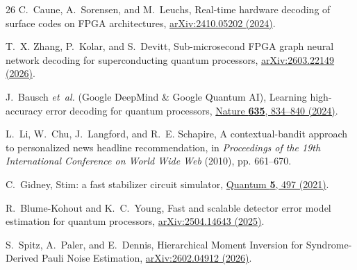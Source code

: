\documentclass[aps,prxquantum,reprint,superscriptaddress,floatfix,nofootinbib]{revtex4-2}
\begin{document}
\begin{thebibliography}{26}
C.~Caune, A.~Sorensen, and M.~Leuchs,
\newblock Real-time hardware decoding of surface codes on FPGA architectures,
\newblock \href{https://arxiv.org/abs/2410.05202}{arXiv:2410.05202 (2024)}.

T.~X. Zhang, P.~Kolar, and S.~Devitt,
\newblock Sub-microsecond FPGA graph neural network decoding for superconducting quantum processors,
\newblock \href{https://arxiv.org/abs/2603.22149}{arXiv:2603.22149 (2026)}.

J.~Bausch \textit{et~al.} (Google DeepMind \& Google Quantum AI),
\newblock Learning high-accuracy error decoding for quantum processors,
\newblock \href{https://doi.org/10.1038/s41586-024-08148-w}{Nature \textbf{635}, 834--840 (2024)}.

L.~Li, W.~Chu, J.~Langford, and R.~E. Schapire,
\newblock A contextual-bandit approach to personalized news headline recommendation,
\newblock in \textit{Proceedings of the 19th International Conference on World Wide Web} (2010), pp. 661--670.

C.~Gidney,
\newblock Stim: a fast stabilizer circuit simulator,
\newblock \href{https://doi.org/10.22331/q-2021-07-06-497}{Quantum \textbf{5}, 497 (2021)}.

R.~Blume-Kohout and K.~C.~Young,
\newblock Fast and scalable detector error model estimation for quantum processors,
\newblock \href{https://arxiv.org/abs/2504.14643}{arXiv:2504.14643 (2025)}.

S.~Spitz, A.~Paler, and E.~Dennis,
\newblock Hierarchical Moment Inversion for Syndrome-Derived Pauli Noise Estimation,
\newblock \href{https://arxiv.org/abs/2602.04912}{arXiv:2602.04912 (2026)}.
\end{thebibliography}
\end{document}
